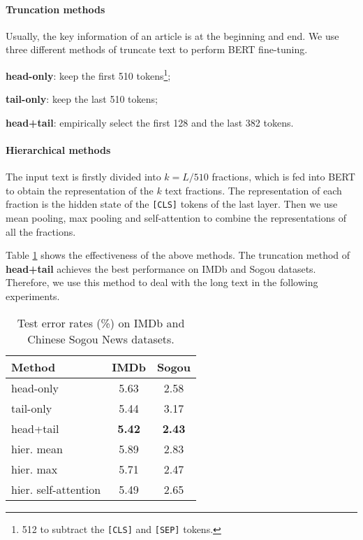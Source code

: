 \documentclass[11pt,a4paper]{article}
\theoremstyle{definition}
\begin{document}
\begin{CJK*}{UTF8}{gbsn}
\paragraph{Truncation methods}
Usually, the key information of an article is at the beginning and end. We use three different methods of truncate text to perform BERT fine-tuning.
\begin{enumerate**}
	\item \textbf{head-only}: keep the first 510 tokens\footnote{512 to subtract the \texttt{[CLS]} and \texttt{[SEP]} tokens.};
	\item \textbf{tail-only}: keep the last 510 tokens;
	\item \textbf{head+tail}: empirically select the first 128 and the last 382 tokens.
\end{enumerate**}

\paragraph{Hierarchical methods}
The input text is firstly divided into $k=L/510$ fractions, which is fed into BERT to obtain the representation of the $k$ text fractions. The representation of each fraction is the hidden state of the \texttt{[CLS]} tokens of the last layer. Then we use mean pooling, max pooling and self-attention to combine the representations of all the fractions.

Table \ref{tb:longtext} shows the effectiveness of the above methods. The truncation method of \textbf{head+tail} achieves the best performance on IMDb and Sogou datasets. Therefore, we use this method to deal with the long text in the following experiments.

	\begin{table}[ht!]\small\setlength{\tabcolsep}{8pt}
		\centering
		\begin{tabular}{l c c}
			\toprule
			Method & IMDb & Sogou \\
			\midrule
			head-only & 5.63 & 2.58 \\
			tail-only & 5.44 & 3.17 \\
			head+tail & \textbf{5.42} & \textbf{2.43} \\
			hier. mean & 5.89 & 2.83  \\
			hier. max & 5.71 & 2.47 \\
			hier. self-attention & 5.49 & 2.65 \\			
			\bottomrule
		\end{tabular}
		\caption{Test error rates (\%) on IMDb and Chinese Sogou News datasets.
		}\label{tb:longtext}
	\end{table}	


\end{CJK*}
\end{document}
